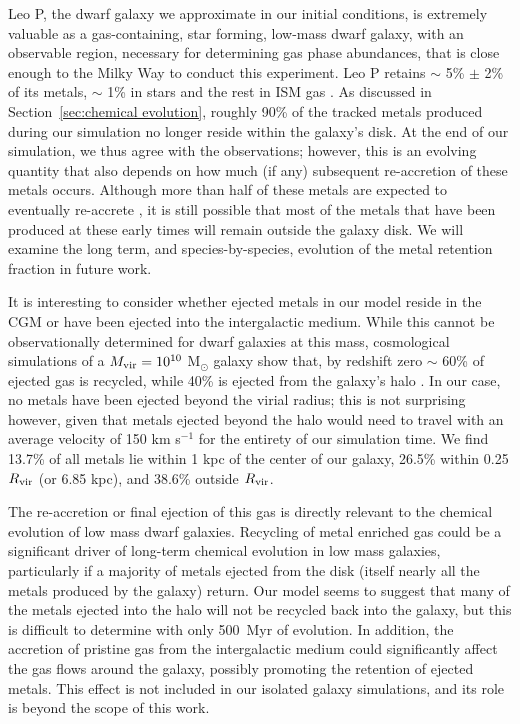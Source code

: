 \documentclass[twocolumn]{aastex61}
\begin{document}
Leo P, the dwarf galaxy we approximate in our initial conditions, is extremely valuable as a %
   gas-containing,
star forming, low-mass dwarf galaxy, with an observable  region, necessary for determining gas phase abundances, that is close enough to the Milky Way to conduct this experiment. Leo P retains $\sim$ 5\% $\pm$ 2\% of its metals, $\sim$ 1\% in stars and the rest in ISM gas \citep{McQuinn2015}. As discussed in Section~\ref{sec:chemical evolution}, roughly 90\% of the tracked metals produced during our simulation no longer reside within the galaxy's disk. At the end of our simulation, we 
   thus
agree with the observations; however, this is an evolving quantity that also depends on how much (if any) subsequent re-accretion of these metals occurs. Although more than half of these metals are expected to eventually re-accrete \citep{Angles-Alcazar2017}, it is still possible that
most of the metals that have been produced at these early times will remain outside the galaxy disk. We will examine the long term, and species-by-species, evolution of the metal retention fraction in future work.

It is interesting to consider whether ejected metals in our model reside in the CGM or have been ejected into the intergalactic medium. While this cannot be observationally determined for dwarf galaxies at this mass, cosmological simulations of a $M_{\rm vir} = 10^{10}$ M$_{\odot}$ galaxy show that, by redshift zero $\sim$ 60\% of ejected gas is recycled, while 40\% is ejected from the galaxy's halo \citep{Angles-Alcazar2017}. In our case, no metals have been ejected beyond the virial radius; this is not surprising however, given that metals ejected beyond the halo would need to travel with an average velocity of 150 km s$^{-1}$ for the entirety of our simulation time.  We find 13.7\% of all metals lie within 1 kpc of the center of our galaxy, 26.5\% within 0.25 $R_{\rm vir}$ (or 6.85 kpc), and 38.6\% outside $R_{\rm vir}$. 

The re-accretion or final ejection of this gas is directly relevant to the chemical evolution of low mass dwarf galaxies. Recycling of metal enriched gas could be a significant driver of long-term chemical evolution in low mass galaxies, particularly if a majority of metals ejected from the disk (itself nearly all the metals produced by the galaxy) return. Our model seems to suggest that many of the metals ejected into the halo will not be recycled back into the galaxy, but this is difficult to determine with only 500~Myr of evolution. In addition, the accretion of pristine gas from the intergalactic medium could significantly affect the gas flows around the galaxy, possibly promoting the retention of ejected metals. This effect is not included in our isolated galaxy simulations, and its role is beyond the scope of this work.
\end{document}
